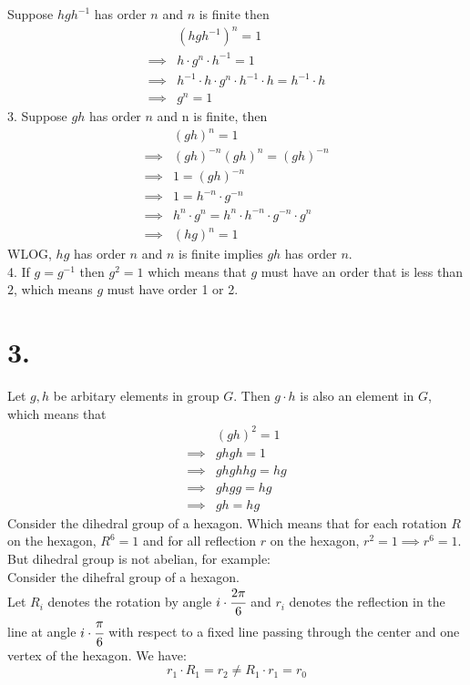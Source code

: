 \documentclass[11pt]{article}
\begin{document}
Suppose $hgh^{-1}$ has order $n$ and $n$ is finite then
\begin{equation*}
\begin{aligned}
& (hgh^{-1})^n = 1 \\
\implies & h \cdot g^n \cdot h^{-1} = 1 \\
\implies & h^{-1} \cdot h \cdot g^n \cdot h^{-1} \cdot h = h^{-1} \cdot h \\
\implies &g^n = 1
\end{aligned}
\end{equation*}
3. Suppose $gh$ has order $n$ and n is finite, then
\begin{equation*}
\begin{aligned}
&(gh)^n = 1 \\
\implies &(gh)^{-n} (gh)^n = (gh)^{-n} \\
\implies & 1 = (gh)^{-n} \\
\implies & 1 = h^{-n} \cdot g^{-n} \\
\implies & h^n \cdot g^n = h^n \cdot h^{-n} \cdot g^{-n} \cdot g^n \\
\implies & (hg)^n = 1
\end{aligned}
\end{equation*}
WLOG, $hg$ has order $n$ and $n$ is finite implies $gh$ has order $n$. \\
4. If $g = g^{-1}$ then $g^2 = 1$ which means that $g$ must have an order that is less than $2$, which means $g$ must have order 1 or 2.











\pagebreak
\section*{3.}
Let $g,h$ be arbitary elements in group $G$. Then $g\cdot h$ is also an element in $G$, which means that
\begin{equation*}
\begin{aligned}
&(gh)^2 = 1 \\
\implies & ghgh = 1 \\
\implies & ghghhg = hg \\
\implies & ghgg = hg \\
\implies & gh = hg 
\end{aligned}
\end{equation*}
Consider the dihedral group of a hexagon. Which means that for each rotation $R$ on the hexagon, $R^6 = 1$ and for all reflection $r$ on the hexagon, $r^2 = 1 \implies r^6 = 1$. But dihedral group is not abelian, for example: \\
Consider the dihefral group of a hexagon. \\
Let $R_i$ denotes the rotation by angle $i \cdot \cfrac{2\pi}{6}$ and $r_i$ denotes the reflection in the line at angle $i \cdot \cfrac{\pi}{6}$ with respect to a fixed line passing through the center and one vertex of the hexagon. We have: 
\[r_1 \cdot R_1 = r_2 \ne R_1 \cdot r_1 = r_0\] 
\end{document}
